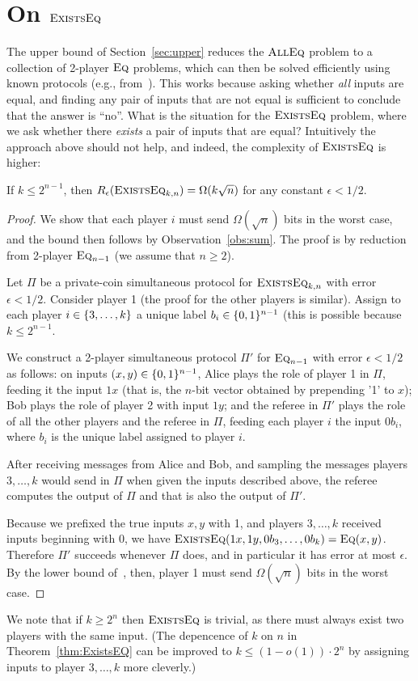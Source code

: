 \section{On $\text{\textsc{ExistsEq}}$}
\label{sec:exists}

The upper bound of Section~\ref{sec:upper} reduces the $\text{\textsc{AllEq}}$ problem to a collection of 2-player $\text{\textsc{Eq}}$ problems,
which can then be solved efficiently using known protocols (e.g., from~\cite{BK97}).
This works because asking whether \emph{all} inputs are equal, and finding any pair of inputs that are not equal is sufficient to conclude that the answer is ``no''. What is the situation for the $\text{\textsc{ExistsEq}}$ problem, where we ask whether there \emph{exists} a pair of inputs that are equal?
Intuitively the approach above should not help, and indeed, the complexity of $\text{\textsc{ExistsEq}}$ is higher:

\begin{theorem}
	If $k \leq 2^{n-1}$, then $R_\epsilon(\text{\textsc{ExistsEq}}_{k,n}) = \Omega(k\sqrt{n})$ for any constant $\epsilon < 1/2$.
	\label{thm:ExistsEQ}
\end{theorem}
\begin{proof}
	We show that each player $i$ must send $\Omega(\sqrt{n})$ bits in the worst case,
	and the bound then follows by Observation~\ref{obs:sum}. The proof is by reduction from 2-player $\text{\textsc{Eq}}_{n-1}$ (we assume that $n \geq 2$).

	Let $\Pi$ be a private-coin simultaneous protocol for $\text{\textsc{ExistsEq}}_{k,n}$ with error $\epsilon < 1/2$.
	Consider player 1 (the proof for the other players is similar).
	Assign to each player $i \in \{ 3,\ldots,k \}$ a unique label $b_i \in \{ 0,1 \}^{n-1}$ (this is possible because $k \leq 2^{n-1}$.

	We construct a 2-player simultaneous protocol $\Pi'$ for $\text{\textsc{Eq}}_{n-1}$ with error $\epsilon < 1/2$ as follows:
	on inputs $(x,y) \in \{ 0,1 \}^{n-1}$,
	Alice plays the role of player 1 in $\Pi$, feeding it the input $1x$ (that is, the $n$-bit vector obtained by prepending '1' to $x$);
	Bob plays the role of player 2 with input $1y$;
	and the referee in $\Pi'$ plays the role of all the other players and the referee in $\Pi$,
	feeding each player $i$ the input $0 b_i$, where $b_i$ is the unique label assigned to player $i$.

	After receiving messages from Alice and Bob, and sampling the messages players $3,\ldots,k$
	would send in $\Pi$ when given the inputs described above,
	the referee computes the output of $\Pi$ and that is also the output of $\Pi'$.

	Because we prefixed the true inputs $x,y$ with 1, and players $3,\ldots,k$
	received inputs beginning with 0, we have $\text{\textsc{ExistsEq}}(1x, 1y, 0b_3,\ldots, 0b_k) = \text{\textsc{Eq}}(x,y)$.
	Therefore $\Pi'$ succeeds whenever $\Pi$ does, and in particular it has error at most $\epsilon$.
	By the lower bound of~\cite{BK97}, then, player 1 must send $\Omega(\sqrt{n})$ bits in the worst case.
\end{proof}
We note that if $k \geq 2^n$ then $\text{\textsc{ExistsEq}}$ is trivial, as there must always exist two players with the same input.
(The depencence of $k$ on $n$ in Theorem~\ref{thm:ExistsEQ} can be improved to $k \leq (1-o(1))\cdot2^n$ by assigning inputs to player $3,\ldots,k$ more cleverly.)

